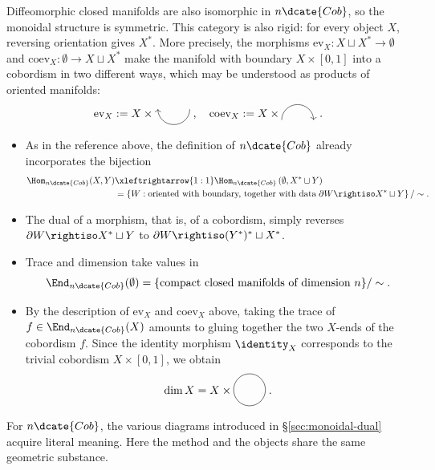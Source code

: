 \begin{example}[Cobordisms]
	Diffeomorphic closed manifolds are also isomorphic in $n\dcate{Cob}$, so
	the monoidal structure is symmetric. This category is also rigid: for every
	object $X$, reversing orientation gives $X^*$. More precisely, the
	morphisms $\mathrm{ev}_X:X\sqcup X^*\to\emptyset$ and
	$\mathrm{coev}_X:\emptyset\to X\sqcup X^*$ make the manifold with
	boundary $X\times[0,1]$ into a cobordism in two different ways, which may
	be understood as products of oriented manifolds:
	\begin{gather*}
		\mathrm{ev}_X := X \times
		\begin{tikzpicture}[baseline=(A), scale=0.5]
			\coordinate (A) at (0, -0.5);
			\draw[<-] (0, 0) arc[radius=1, start angle=180, end angle=360];
		\end{tikzpicture} \; , \quad
		\mathrm{coev}_X := X \times
		\begin{tikzpicture}[baseline=(A), scale=0.5]
			\coordinate (A) at (0, 0.2);
			\draw[->] (0, 0) arc[radius=1, start angle=180, end angle=0];
		\end{tikzpicture} \; .
	\end{gather*}
	\begin{itemize}
		\item As in the reference above, the definition of $n\dcate{Cob}$
		already incorporates the bijection
		\begin{align*}
			\Hom_{n\dcate{Cob}}(X, Y) & \xleftrightarrow{1:1} \Hom_{n\dcate{Cob}}\left( \emptyset, X^* \sqcup Y\right) \\
			& = \left\{ W: \text{oriented with boundary, together with data}\; \partial W \rightiso X^* \sqcup Y \right\} / \sim .
		\end{align*}
		\item The dual of a morphism, that is, of a cobordism, simply reverses
		$\partial W\rightiso X^*\sqcup Y$ to
		$\partial W\rightiso(Y^*)^*\sqcup X^*$.
		\item Trace and dimension take values in
		\[ \End_{n\dcate{Cob}}(\emptyset)=
		\{\text{compact closed manifolds of dimension }n\}/\sim . \]
		\item By the description of $\mathrm{ev}_X$ and $\mathrm{coev}_X$
		above, taking the trace of $f\in\End_{n\dcate{Cob}}(X)$ amounts to
		gluing together the two $X$-ends of the cobordism $f$. Since the
		identity morphism $\identity_X$ corresponds to the trivial cobordism
		$X\times[0,1]$, we obtain
		\[ \dim X = X \times
		\begin{tikzpicture}[baseline=(O), scale=0.5]
			\coordinate (O) at (0, -0.25);
			\draw (0, 0) circle[radius=1];
		\end{tikzpicture} \; . \]
	\end{itemize}

	For $n\dcate{Cob}$, the various diagrams introduced in
	\S\ref{sec:monoidal-dual} acquire literal meaning. Here the method and the
	objects share the same geometric substance.
\end{example}
